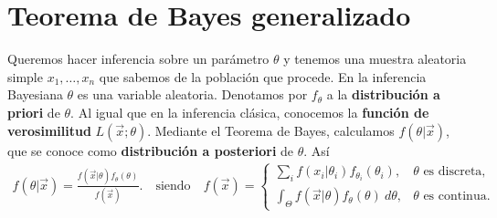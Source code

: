 \section{Teorema de Bayes generalizado}
Queremos hacer inferencia sobre un parámetro $\theta$ y tenemos una muestra aleatoria simple $x_1,\ldots,x_n$ que sabemos de la población que procede. En la inferencia Bayesiana $\theta$ es una variable aleatoria. Denotamos por $f_{\theta}$ a la \textbf{distribución a priori} de $\theta$. Al igual que en la inferencia clásica, conocemos la \textbf{función de verosimilitud} $L(\vec{x};\theta)$. Mediante el Teorema de Bayes, calculamos $f(\theta | \vec{x})$, que se conoce como \textbf{distribución a posteriori} de $\theta$. Así
\begin{align*}
    f(\theta | \vec{x}) = \frac{f(\vec{x} | \theta) f_{\theta}(\theta)}{f(\vec{x})}. \quad \text{siendo} \quad f(\vec{x}) = \begin{cases}
                                                                                                                                \sum_i f(x_i | \theta_i)f_{\theta_i}(\theta_i),                 & \theta \text{ es discreta}, \\
                                                                                                                                \int_{\Theta} f(\vec{x} | \theta) f_{\theta}(\theta) \ d\theta, & \theta \text{ es continua}.
                                                                                                                            \end{cases}
\end{align*}

